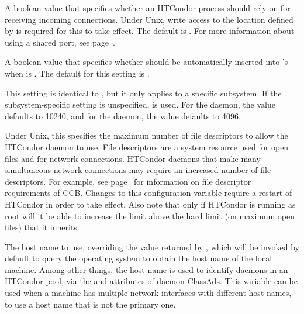 \begin{description}
\label{param:UseSharedPort}
\item[\Macro{USE\_SHARED\_PORT}] A boolean value that
  specifies whether an HTCondor process should rely on
   for receiving incoming connections.  
  Under Unix, write access to the location defined by 
   is required for this to take
  effect.  The default is .
  For more information about using
  a shared port, see page~\pageref{sec:Config-shared-port}.

\label{param:AutoIncludeSharedPortInDaemonList}
\item[\Macro{AUTO\_INCLUDE\_SHARED\_PORT\_IN\_DAEMON\_LIST}] A boolean
  value that specifies whether  should be
  automatically inserted into 's 
  when  is .  The default for this
  setting is .

\label{param:SubsysMaxFileDescriptors}
\item[\MacroB{<SUBSYS>\_MAX\_FILE\_DESCRIPTORS}]
This setting is identical to , but it
only applies to a specific subsystem.  If the
subsystem-specific setting is unspecified, 
is used.
For the  daemon, the value defaults to 10240, and
for the  daemon, the value defaults to 4096.

\label{param:MaxFileDescriptors}
\item[\Macro{MAX\_FILE\_DESCRIPTORS}] Under Unix, this specifies the
maximum number of file descriptors to allow the HTCondor daemon to use.
File descriptors are a system resource used for open files and for
network connections.  HTCondor daemons that make many simultaneous
network connections may require an increased number of file
descriptors.  For example, see page~\pageref{sec:CCB} for information
on file descriptor requirements of CCB.  Changes to this configuration
variable require a restart of HTCondor in order to take effect.  Also note
that only if HTCondor is running as root will it be able to increase the
limit above the hard limit (on maximum open files) that it inherits.

\label{param:NetworkHostname}
\item[\Macro{NETWORK\_HOSTNAME}]
The host name to use,
overriding the value returned by
, which will be invoked by default
to query the operating system to obtain the host name of the local machine. 
Among other things, the host name is used to identify daemons in
an HTCondor pool, via the  and  attributes of 
daemon ClassAds.
This variable can be used when a machine has multiple network interfaces
with different host names, 
to use a host name that is not the primary one.


\end{description}
